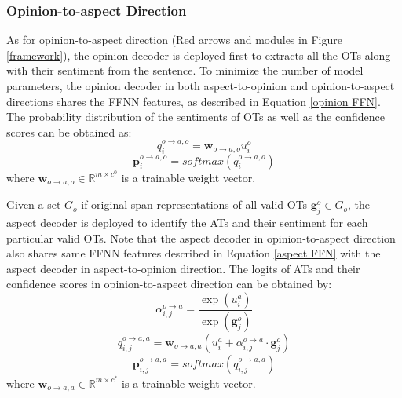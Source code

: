 \documentclass[11pt]{article}
\begin{document}
\subsubsection{Opinion-to-aspect Direction}
As for opinion-to-aspect direction (Red arrows and modules in Figure \ref{framework}), the opinion decoder is deployed first to extracts all the OTs along with their sentiment from the sentence. To minimize the number of model parameters, the opinion decoder in both aspect-to-opinion and opinion-to-aspect directions shares the FFNN features, as described in Equation \eqref{opinion FFN}. The probability distribution of the sentiments of OTs as well as the confidence scores can be obtained as:
\begin{equation}
	q^{o\rightarrow a,o}_{i}=\mathbf{w}_{o\rightarrow a,o}u^{o}_{i}
\end{equation}
\begin{equation}
	\mathbf{p}^{o\rightarrow a,o}_{i}=softmax(q^{o\rightarrow a,o}_{i})
\end{equation}
where $\mathbf{w}_{o\rightarrow a,o}\in\mathbb{R}^{m\times c^{0}}$ is a trainable weight vector. 

Given a set $G_{o}$ if original span representations of all valid OTs $\mathbf{g}^{o}_{j}\in G_{o}$, the aspect decoder is deployed to identify the ATs and their sentiment for each particular valid OTs. Note that the aspect decoder in opinion-to-aspect direction also shares same FFNN features described in Equation \eqref{aspect FFN} with the aspect decoder in aspect-to-opinion direction. The logits of ATs and their confidence scores in opinion-to-aspect direction can be obtained by:
\begin{equation} 			
	\alpha^{o\rightarrow a}_{i,j}=\frac{\exp(u^{a}_{i})}  {\exp(\mathbf{g}^{o}_{j})}
\end{equation}
\begin{equation}
	q^{o\rightarrow a,a}_{i,j}=\mathbf{w}_{o\rightarrow a,a}\left(u^{a}_{i} + \alpha^{o\rightarrow a}_{i,j} \cdot \mathbf{g}^{o}_{j} \right)
\end{equation}
\begin{equation}
	\mathbf{p}^{o\rightarrow a,a}_{i,j}=softmax(q^{o\rightarrow a,a}_{i,j})
\end{equation}
where $\mathbf{w}_{o\rightarrow a,a}\in \mathbb{R}^{m\times c^{*}}$ is a trainable weight vector. 
\end{document}
